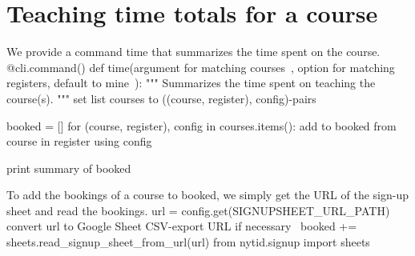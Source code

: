 \section{Teaching time totals for a course}

We provide a command {\Tt{}time\nwendquote} that summarizes the time spent on the course.
\nwenddocs{}\endmoddef\nwstartdeflinemarkup{}\nwenddeflinemarkup
@cli.command()
def time(\LA{}argument for matching courses~{\nwtagstyle{}}\RA{},
         \LA{}option for matching registers, default to mine~{\nwtagstyle{}}\RA{}):
  """
  Summarizes the time spent on teaching the course(s).
  """
  \LA{}set list \code{}courses\edoc{} to ((course, register), config)-pairs~{\nwtagstyle{}}\RA{}

  booked = []
  for (course, register), config in courses.items():
    \LA{}add to \code{}booked\edoc{} from \code{}course\edoc{} in \code{}register\edoc{} using \code{}config\edoc{}~{\nwtagstyle{}}\RA{}

  \LA{}print summary of \code{}booked\edoc{}~{\nwtagstyle{}}\RA{}
\nwendcode{}\nwdocspar

To add the bookings of a course to {\Tt{}booked\nwendquote}, we simply get the URL of the 
sign-up sheet and read the bookings.
\nwenddocs{}\endmoddef\nwstartdeflinemarkup{}\nwenddeflinemarkup
url = config.get(SIGNUPSHEET_URL_PATH)
\LA{}convert \code{}url\edoc{} to Google Sheet CSV-export URL if necessary~{\nwtagstyle{}}\RA{}
booked += sheets.read_signup_sheet_from_url(url)
\nwendcode{}\plusendmoddef\nwstartdeflinemarkup{}\nwenddeflinemarkup
from nytid.signup import sheets
\nwendcode{}\nwdocspar

